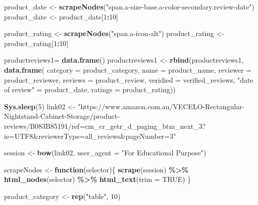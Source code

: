 \documentclass[
]{article}
\newenvironment{Shaded}{\begin{snugshade}}{\end{snugshade}}
\newcommand{\AttributeTok}[1]{\textcolor[rgb]{0.13,0.29,0.53}{#1}}
\newcommand{\ConstantTok}[1]{\textcolor[rgb]{0.56,0.35,0.01}{#1}}
\newcommand{\ControlFlowTok}[1]{\textcolor[rgb]{0.13,0.29,0.53}{\textbf{#1}}}
\newcommand{\DecValTok}[1]{\textcolor[rgb]{0.00,0.00,0.81}{#1}}
\newcommand{\FunctionTok}[1]{\textcolor[rgb]{0.13,0.29,0.53}{\textbf{#1}}}
\newcommand{\NormalTok}[1]{#1}
\newcommand{\OtherTok}[1]{\textcolor[rgb]{0.56,0.35,0.01}{#1}}
\newcommand{\SpecialCharTok}[1]{\textcolor[rgb]{0.81,0.36,0.00}{\textbf{#1}}}
\newcommand{\StringTok}[1]{\textcolor[rgb]{0.31,0.60,0.02}{#1}}
\begin{document}
\begin{Shaded}
\begin{Highlighting}[]
\NormalTok{  product\_date }\OtherTok{\textless{}{-}} \FunctionTok{scrapeNodes}\NormalTok{(}\StringTok{"span.a{-}size{-}base.a{-}color{-}secondary.review{-}date"}\NormalTok{)}
\NormalTok{  product\_date }\OtherTok{\textless{}{-}}\NormalTok{ product\_date[}\DecValTok{1}\SpecialCharTok{:}\DecValTok{10}\NormalTok{]}
  
\NormalTok{  product\_rating }\OtherTok{\textless{}{-}} \FunctionTok{scrapeNodes}\NormalTok{(}\StringTok{"span.a{-}icon{-}alt"}\NormalTok{)}
\NormalTok{  product\_rating }\OtherTok{\textless{}{-}}\NormalTok{ product\_rating[}\DecValTok{1}\SpecialCharTok{:}\DecValTok{10}\NormalTok{]}
  
\NormalTok{  productreviews1}\OtherTok{=} \FunctionTok{data.frame}\NormalTok{()}
\NormalTok{  productreviews1 }\OtherTok{\textless{}{-}} \FunctionTok{rbind}\NormalTok{(productreviews1, }\FunctionTok{data.frame}\NormalTok{(}
                      \AttributeTok{category =}\NormalTok{ product\_category,}
                      \AttributeTok{name =}\NormalTok{ product\_name,}
                      \AttributeTok{reviewer =}\NormalTok{ product\_reviewer,}
                      \AttributeTok{reviews =}\NormalTok{ product\_review,}
                      \AttributeTok{veridied =}\NormalTok{ verified\_reviews,}
                      \StringTok{"date of review"} \OtherTok{=}\NormalTok{ product\_date,}
                      \AttributeTok{ratings =}\NormalTok{ product\_rating))}

  
 \FunctionTok{Sys.sleep}\NormalTok{(}\DecValTok{5}\NormalTok{)}
\NormalTok{link02 }\OtherTok{\textless{}{-}} \StringTok{"https://www.amazon.com.au/VECELO{-}Rectangular{-}Nightstand{-}Cabinet{-}Storage/product{-}reviews/B083B85191/ref=cm\_cr\_getr\_d\_paging\_btm\_next\_3?ie=UTF8\&reviewerType=all\_reviews\&pageNumber=3"}


\NormalTok{  session }\OtherTok{\textless{}{-}} \FunctionTok{bow}\NormalTok{(link02,}
               \AttributeTok{user\_agent =} \StringTok{"For Educational Purpose"}\NormalTok{)}

\NormalTok{  scrapeNodes }\OtherTok{\textless{}{-}} \ControlFlowTok{function}\NormalTok{(selector)\{}
    \FunctionTok{scrape}\NormalTok{(session) }\SpecialCharTok{\%\textgreater{}\%}
      \FunctionTok{html\_nodes}\NormalTok{(selector) }\SpecialCharTok{\%\textgreater{}\%}
      \FunctionTok{html\_text}\NormalTok{(}\AttributeTok{trim =} \ConstantTok{TRUE}\NormalTok{)}
\NormalTok{  \}}

\NormalTok{  product\_category }\OtherTok{\textless{}{-}} \FunctionTok{rep}\NormalTok{(}\StringTok{"table"}\NormalTok{, }\DecValTok{10}\NormalTok{)}


\end{Highlighting}
\end{Shaded}
\end{document}
